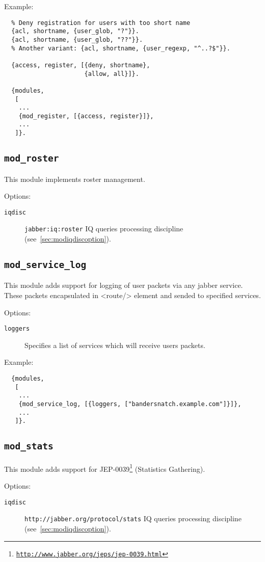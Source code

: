 \documentclass[a4paper,10pt]{article}
\newcommand{\bracehack}{\def\{{\char"7B}\def\}{\char"7D}}
\newcommand{\ns}[1]{\texttt{#1}}
\newcommand{\module}[1]{\texttt{#1}}
\newcommand{\modroster}{\module{mod\_roster}}
\newcommand{\modservicelog}{\module{mod\_service\_log}}
\newcommand{\modstats}{\module{mod\_stats}}
\newcommand{\titem}[1]{\item[\bracehack\texttt{#1}]}
\gdef\footahref#1#2{#2\footnote{\href{#1}{\texttt{#1}}}}
\newcommand{\tjepref}[2]{\footahref{http://www.jabber.org/jeps/jep-#1.html}{#2}}
\newcommand{\jepref}[1]{\tjepref{#1}{JEP-#1}}
\newcommand{\iqdiscitem}[1]{\titem{iqdisc} #1 IQ queries processing
discipline (see~\ref{sec:modiqdiscoption}).}
\begin{document}
Example:
\begin{verbatim}
  % Deny registration for users with too short name
  {acl, shortname, {user_glob, "?"}}.
  {acl, shortname, {user_glob, "??"}}.
  % Another variant: {acl, shortname, {user_regexp, "^..?$"}}.

  {access, register, [{deny, shortname},
                      {allow, all}]}.

  {modules,
   [
    ...
    {mod_register, [{access, register}]},
    ...
   ]}.
\end{verbatim}


\subsection{\modroster{}}
\label{sec:modroster}

This module implements roster management.

Options:
\begin{description}
\iqdiscitem{\ns{jabber:iq:roster}}
\end{description}


\subsection{\modservicelog{}}
\label{sec:modservicelog}

This module adds support for logging of user packets via any jabber service.
These packets encapsulated in <route/> element and sended to specified
services.

Options:
\begin{description}
  \titem{loggers} Specifies a list of services which will receive users
  packets.
\end{description}

Example:
\begin{verbatim}
  {modules,
   [
    ...
    {mod_service_log, [{loggers, ["bandersnatch.example.com"]}]},
    ...
   ]}.
\end{verbatim}


\subsection{\modstats{}}
\label{sec:modstats}

This module adds support for \jepref{0039} (Statistics Gathering).

Options:
\begin{description}
\iqdiscitem{\ns{http://jabber.org/protocol/stats}}
\end{description}
\end{document}

